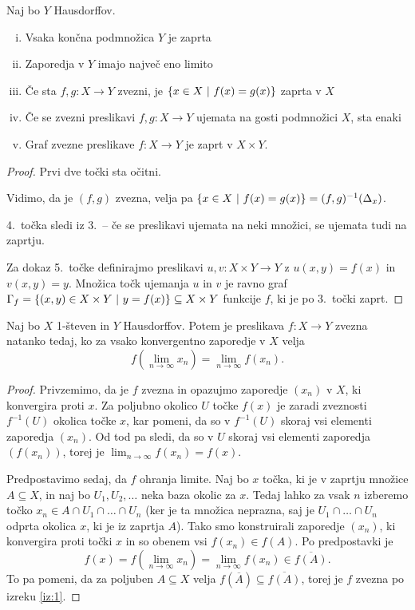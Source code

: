 \begin{izrek}
Naj bo $Y$ Hausdorffov.

\begin{enumerate}[i)]
\item Vsaka končna podmnožica $Y$ je zaprta
\item Zaporedja v $Y$ imajo največ eno limito
\item Če sta $f, g \colon X \to Y$ zvezni, je
$\left\{x \in X~\middle\vert~f(x) = g(x)\right\}$ zaprta v $X$
\item Če se zvezni preslikavi $f, g \colon X \to Y$ ujemata na
gosti podmnožici $X$, sta enaki
\item Graf zvezne preslikave $f \colon X \to Y$ je zaprt v
$X \times Y$.
\end{enumerate}
\end{izrek}

\begin{proof}
Prvi dve točki sta očitni.

Vidimo, da je $(f,g)$ zvezna, velja pa
$\left\{x \in X~\middle\vert~f(x) = g(x)\right\} = (f,g)^{-1}(\Delta_x)$.

4.\ točka sledi iz 3.\ -- če se preslikavi ujemata na neki množici,
se ujemata tudi na zaprtju.

Za dokaz 5.\ točke definirajmo preslikavi
$u, v \colon X \times Y \to Y$ z $u(x,y) = f(x)$ in $v(x,y) = y$.
Množica točk ujemanja $u$ in $v$ je ravno graf
$\Gamma_f =
\left\{(x,y) \in X \times Y~\middle\vert~y = f(x)\right\} \subseteq X \times Y$
 funkcije $f$, ki je po 3.\ točki zaprt.
\end{proof}

\begin{izrek}
Naj bo $X$ 1-števen in $Y$ Hausdorffov. Potem je preslikava
$f \colon X \to Y$ zvezna natanko tedaj, ko za vsako konvergentno
zaporedje v $X$ velja
\[
f\left(\lim_{n\to\infty} x_n\right) = \lim_{n\to\infty} f(x_n).
\]
\end{izrek}

\begin{proof}
Privzemimo, da je $f$ zvezna in opazujmo zaporedje $(x_n)$ v $X$,
ki konvergira proti $x$. Za poljubno okolico $U$ točke $f(x)$ je
zaradi zveznosti $f^{-1}(U)$ okolica točke $x$, kar pomeni, da so v
$f^{-1}(U)$ skoraj vsi elementi zaporedja $(x_n)$. Od tod pa sledi,
da so v $U$ skoraj vsi elementi zaporedja $(f(x_n))$, torej je
$\lim_{n \to \infty} f(x_n) = f(x)$.

Predpostavimo sedaj, da $f$ ohranja limite. Naj bo $x$ točka, ki je
v zaprtju množice $A \subseteq X$, in naj bo $U_1, U_2, \dots$ neka
baza okolic za $x$. Tedaj lahko za vsak $n$ izberemo točko
$x_n \in A \cap U_1 \cap \dots \cap U_n$ (ker je ta množica
neprazna, saj je $U_1 \cap \dots \cap U_n$ odprta okolica $x$, ki
je iz zaprtja $A$). Tako smo konstruirali zaporedje $(x_n)$, ki
konvergira proti točki $x$ in so obenem vsi $f(x_n) \in f(A)$. Po
predpostavki je
\[
f(x) =
f\left(\lim_{n \to \infty} x_n\right) =
\lim_{n \to \infty} f(x_n)
\in \overline{f(A)}.
\]
To pa pomeni, da za poljuben $A \subseteq X$ velja
$f(\overline{A}) \subseteq \overline{f(A)}$, torej je $f$ zvezna po
izreku \ref{iz:1}.
\end{proof}


